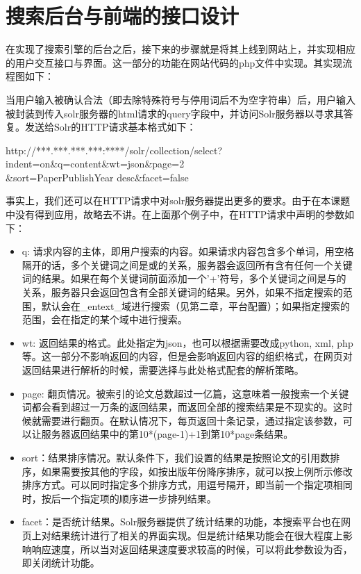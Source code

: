 
\chapter{搜索后台与前端的接口设计}
\label{chap:c4}

在实现了搜索引擎的后台之后，接下来的步骤就是将其上线到网站上，并实现相应的用户交互接口与界面。这一部分的功能在网站代码的php文件中实现。其实现流程图如下：

\begin{figure}[!htp]
    \centering
    \resizebox{7cm}{!}{}
\end{figure}

当用户输入被确认合法（即去除特殊符号与停用词后不为空字符串）后，用户输入被封装到传入solr服务器的html请求的query字段中，并访问Solr服务器以寻求其答复。发送给Solr的HTTP请求基本格式如下：

http://***.***.***.***:****/solr/collection/select?indent=on\&q=content\&wt=json\&page=2\\
\&sort=PaperPublishYear desc\&facet=false

事实上，我们还可以在HTTP请求中对solr服务器提出更多的要求。由于在本课题中没有得到应用，故略去不讲。在上面那个例子中，在HTTP请求中声明的参数如下：

\begin{itemize}
\item q: 请求内容的主体，即用户搜索的内容。如果请求内容包含多个单词，用空格隔开的话，多个关键词之间是或的关系，服务器会返回所有含有任何一个关键词的结果。如果在每个关键词前面添加一个'+'符号，多个关键词之间是与的关系，服务器只会返回包含有全部关键词的结果。另外，如果不指定搜索的范围，默认会在\_entext\_域进行搜索（见第二章，平台配置）；如果指定搜索的范围，会在指定的某个域中进行搜索。
\item wt: 返回结果的格式。此处指定为json，也可以根据需要改成python, xml, php等。这一部分不影响返回的内容，但是会影响返回内容的组织格式，在网页对返回结果进行解析的时候，需要选择与此处格式配套的解析策略。
\item page: 翻页情况。被索引的论文总数超过一亿篇，这意味着一般搜索一个关键词都会看到超过一万条的返回结果，而返回全部的搜索结果是不现实的。这时候就需要进行翻页。在默认情况下，每页返回十条记录，通过指定该参数，可以让服务器返回结果中的第10*(page-1)+1到第10*page条结果。
\item sort：结果排序情况。默认条件下，我们设置的结果是按照论文的引用数排序，如果需要按其他的字段，如按出版年份降序排序，就可以按上例所示修改排序方式。可以同时指定多个排序方式，用逗号隔开，即当前一个指定项相同时，按后一个指定项的顺序进一步排列结果。
\item facet：是否统计结果。Solr服务器提供了统计结果的功能，本搜索平台也在网页上对结果统计进行了相关的界面实现。但是统计结果功能会在很大程度上影响响应速度，所以当对返回结果速度要求较高的时候，可以将此参数设为否，即关闭统计功能。
\end{itemize}

